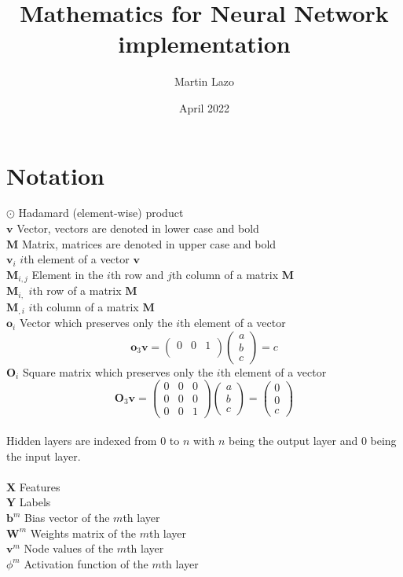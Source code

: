 \documentclass{article}
\title{Mathematics for Neural Network implementation}
\author{Martin Lazo}
\date{April 2022}
\begin{document}
\maketitle
\section{Notation}
\noindent
$\odot$ \tab Hadamard (element-wise) product\\
$\textbf{v}$ \tab Vector, vectors are denoted in lower case and bold\\
$\textbf{M}$ \tab Matrix, matrices are denoted in upper case and bold\\
$\textbf{v}_i$ \tab $i$th element of a vector $\textbf{v}$\\
$\textbf{M}_{i,j}$ \tab Element in the $i$th row and $j$th column of a matrix $\textbf{M}$\\
$\textbf{M}_{i,}$ \tab $i$th row of a matrix $\textbf{M}$\\
$\textbf{M}_{,i}$ \tab $i$th column of a matrix $\textbf{M}$\\
$\textbf{o}_i$ \tab Vector which preserves only the $i$th element of a vector\\
$$
\textbf{o}_3\textbf{v}=
\begin{pmatrix}
0 & 0 & 1\\
\end{pmatrix}
\begin{pmatrix}
a\\
b\\
c
\end{pmatrix}
=
c
$$
$\textbf{O}_i$ \tab Square matrix which preserves only the $i$th element of a vector\\
$$
\textbf{O}_3\textbf{v}=
\begin{pmatrix}
0 & 0 & 0\\
0 & 0 & 0\\
0 & 0 & 1
\end{pmatrix}
\begin{pmatrix}
a\\
b\\
c
\end{pmatrix}
=
\begin{pmatrix}
0\\
0\\
c
\end{pmatrix}
$$
\\
Hidden layers are indexed from $0$ to $n$ with $n$ being the output layer and $0$ being the input layer.\\
\\
$\textbf{X}$ \tab Features\\
$\textbf{Y}$ \tab Labels\\
$\textbf{b}^m$ \tab Bias vector of the $m$th layer\\
$\textbf{W}^m$ \tab Weights matrix of the $m$th layer\\
$\textbf{v}^m$ \tab Node values of the $m$th layer\\
$\phi^m$ \tab Activation function of the $m$th layer\\
\pagebreak
\end{document}
